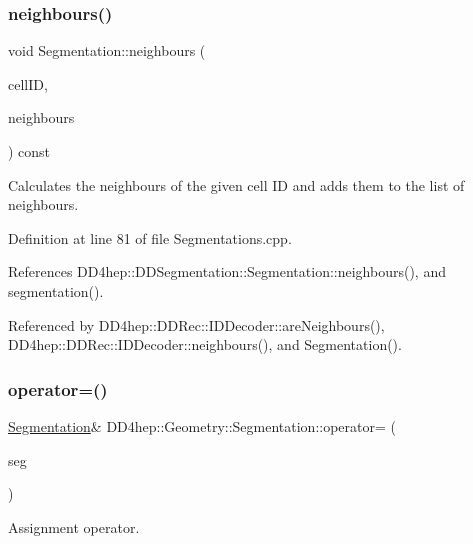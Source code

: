 \subsubsection{\texorpdfstring{neighbours()}{neighbours()}}
{\footnotesize\ttfamily void Segmentation\+::neighbours (\begin{DoxyParamCaption}\item[{const Cell\+ID \&}]{cell\+ID,  }\item[{std\+::set$<$ Cell\+ID $>$ \&}]{neighbours }\end{DoxyParamCaption}) const}



Calculates the neighbours of the given cell ID and adds them to the list of neighbours. 



Definition at line 81 of file Segmentations.\+cpp.



References D\+D4hep\+::\+D\+D\+Segmentation\+::\+Segmentation\+::neighbours(), and segmentation().



Referenced by D\+D4hep\+::\+D\+D\+Rec\+::\+I\+D\+Decoder\+::are\+Neighbours(), D\+D4hep\+::\+D\+D\+Rec\+::\+I\+D\+Decoder\+::neighbours(), and Segmentation().

\hypertarget{class_d_d4hep_1_1_geometry_1_1_segmentation_aacce6e3180ed687609273b30eaf19723}{}\label{class_d_d4hep_1_1_geometry_1_1_segmentation_aacce6e3180ed687609273b30eaf19723} 
\subsubsection{\texorpdfstring{operator=()}{operator=()}}
{\footnotesize\ttfamily \hyperlink{class_d_d4hep_1_1_geometry_1_1_segmentation}{Segmentation}\& D\+D4hep\+::\+Geometry\+::\+Segmentation\+::operator= (\begin{DoxyParamCaption}\item[{const \hyperlink{class_d_d4hep_1_1_geometry_1_1_segmentation}{Segmentation} \&}]{seg }\end{DoxyParamCaption})\hspace{0.3cm}{\ttfamily [default]}}



Assignment operator. 



